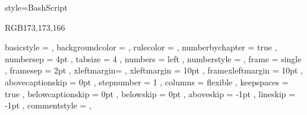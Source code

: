 {
    style=BashScript
}


\definecolor{sublimegray} {RGB}{173,173,166}

{
    basicstyle       = 
    \ttfamily\color{sublimewhite}
    \lst@ifdisplaystyle\scriptsize\fi %
,   backgroundcolor  = \color{sublimeblack}
,   rulecolor        = \color{black}
,   numberbychapter  = true
,   numbersep        = 4pt
,   tabsize          =  4          
,   numbers          = left
,   numberstyle      = \tiny\color{sublimewhite}\noncopynumber
,   frame            = single
,   framesep         =  2pt
,   xleftmargin=\parindent
,   xleftmargin      = 10pt
,   framexleftmargin = 10pt
,   abovecaptionskip = 0pt
,   stepnumber       = 1
,   columns          = flexible
,   keepspaces       = true
,   belowcaptionskip = 0pt
,   belowskip        = 0pt
,   aboveskip        = -1pt
,   lineskip         = -1pt
,   commentstyle     = \color{sublimegray},
}
